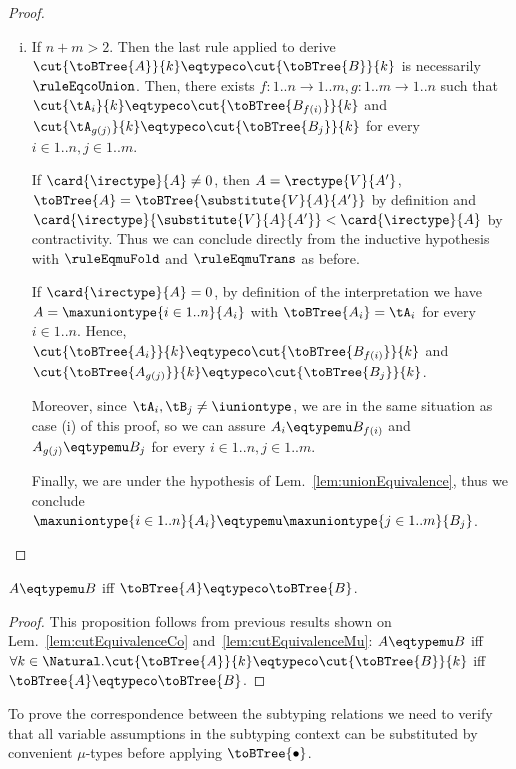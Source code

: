 \begin{proof}
\begin{enumerate}[(i)]
  \item If $n + m > 2$. Then the last rule applied to derive
  $\cut{\toBTree{A}}{k} \eqtypeco \cut{\toBTree{B}}{k}$ is necessarily
  $\ruleEqcoUnion$. Then, there exists $f : 1..n \to 1..m, g : 1..m \to 1..n$
  such that $\cut{\tA_i}{k} \eqtypeco \cut{\toBTree{B_{f(i)}}}{k}$ and
  $\cut{\tA_{g(j)}}{k} \eqtypeco \cut{\toBTree{B_j}}{k}$ for every $i \in 1..n,
  j \in 1..m$.
  
  If $\card{\irectype}{A} \neq 0$, then $A = \rectype{V}{A'}$, $\toBTree{A} =
  \toBTree{\substitute{V}{A}{A'}}$ by definition and
  $\card{\irectype}{\substitute{V}{A}{A'}} < \card{\irectype}{A}$ by
  contractivity. Thus we can conclude directly from the inductive hypothesis
  with $\ruleEqmuFold$ and $\ruleEqmuTrans$ as before.
  
  If $\card{\irectype}{A} = 0$, by definition of the interpretation we have $A
  = \maxuniontype{i \in 1..n}{A_i}$ with $\toBTree{A_i} = \tA_i$ for every $i
  \in 1..n$. Hence, $\cut{\toBTree{A_i}}{k} \eqtypeco
  \cut{\toBTree{B_{f(i)}}}{k}$ and $\cut{\toBTree{A_{g(j)}}}{k} \eqtypeco
  \cut{\toBTree{B_j}}{k}$.
  
  Moreover, since $\tA_i, \tB_j \neq \iuniontype$, we are in the same situation
  as case (i) of this proof, so we can assure $A_i \eqtypemu B_{f(i)}$ and
  $A_{g(j)} \eqtypemu B_j$ for every $i \in 1..n, j \in 1..m$.
  
  Finally, we are under the hypothesis of Lem.~\ref{lem:unionEquivalence}, thus
  we conclude $\maxuniontype{i \in 1..n}{A_i} \eqtypemu \maxuniontype{j \in
  1..m}{B_j}$.
\end{enumerate}
\end{proof}



\begin{proposition}
\label{prop:eqtypeSoundnessAndCompleteness}
$A \eqtypemu B$ iff $\toBTree{A} \eqtypeco \toBTree{B}$.
\end{proposition}

\begin{proof}
This proposition follows from previous results shown on
Lem.~\ref{lem:cutEquivalenceCo} and~\ref{lem:cutEquivalenceMu}: $A \eqtypemu B$
iff $\forall k \in \Natural.\cut{\toBTree{A}}{k} \eqtypeco
\cut{\toBTree{B}}{k}$ iff $\toBTree{A} \eqtypeco \toBTree{B}$.
\end{proof}



To prove the correspondence between the subtyping relations we need to verify
that all variable assumptions in the subtyping context can be substituted by
convenient $\mu$-types before applying $\toBTree{\bullet}$.

